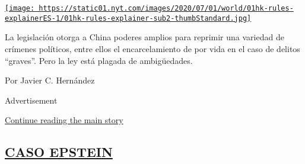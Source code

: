 \begin{enumerate}
\begin{enumerate}
    \href{/es/2020/07/01/espanol/mundo/china-ley-seguridad-Hong-Kong.html}{\texttt{[image: https://static01.nyt.com/images/2020/07/01/world/01hk-rules-explainerES-1/01hk-rules-explainer-sub2-thumbStandard.jpg]}}

    La legislación otorga a China poderes amplios para reprimir una
    variedad de crímenes políticos, entre ellos el encarcelamiento de
    por vida en el caso de delitos ``graves''. Pero la ley está plagada
    de ambigüedades.

    Por Javier C. Hernández
  \end{enumerate}
\end{enumerate}

Advertisement

\protect\hyperlink{after-mid1}{Continue reading the main story}

\hypertarget{caso-epstein}{%
\subsection{\texorpdfstring{\protect\hyperlink{}{CASO
EPSTEIN}}{CASO EPSTEIN}}\label{caso-epstein}}

